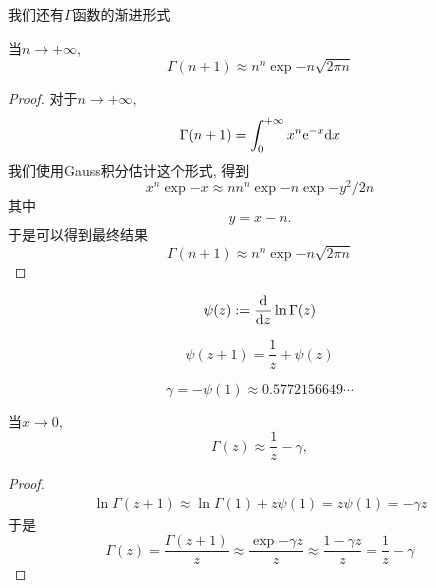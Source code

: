 我们还有$\Gamma$函数的渐进形式
\begin{theorem}
    当$n\to+\infty$, 
    \begin{equation}
        \Gamma(n+1)\approx n^n\exp{-n}\sqrt{2\pi n}
    \end{equation}
\end{theorem}
\begin{proof}
    对于$n\to+\infty$, 
    \begin{align}
        \Gamma(n+1)=\int_0^{+\infty} x^n\mathrm e^{-x}\mathrm d x
    \end{align}
    我们使用Gauss积分\cite{SchroederGamma}估计这个形式, 得到
    \begin{equation}
        x^n\exp{-x}\approx nn^n\exp{-n}\exp{-y^2/2n}
    \end{equation}
    其中
    \begin{equation}
        y=x-n.
    \end{equation}
    于是可以得到最终结果
    \begin{equation}
        \Gamma(n+1)\approx n^n\exp{-n}\sqrt{2\pi n}
    \end{equation}
\end{proof}

\begin{definition}
    \begin{equation}
        \psi(z):=\frac{\mathrm d}{\mathrm dz}\ln\Gamma(z)
    \end{equation}
\end{definition}
\begin{theorem}
    \begin{equation}
        \psi(z+1)=\frac1z+\psi(z)
    \end{equation}
\end{theorem}
\begin{definition}
    \begin{equation}
        \gamma=-\psi(1)\approx0.5772156649\cdots
    \end{equation}
\end{definition}

\begin{theorem}
    当$x\to0$, 
    \begin{equation}
        \Gamma(z)\approx \frac 1z-\gamma,
    \end{equation}
\end{theorem}
\begin{proof}
    \begin{align}
        \ln\Gamma(z+1)\approx\ln\Gamma(1)+z\psi(1)=z\psi(1)=-\gamma z
    \end{align}
    于是
    \begin{equation}
        \Gamma(z)=\frac{\Gamma(z+1)}{z}\approx\frac{\exp{-\gamma z}}{z}\approx\frac{1-\gamma z}{z}=\frac 1z-\gamma
    \end{equation}
\end{proof}

